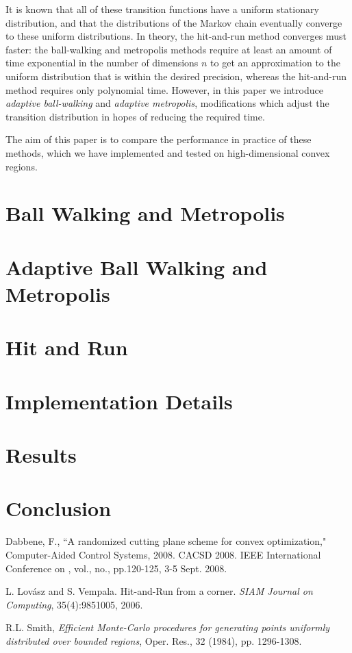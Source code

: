 \documentclass[11pt]{article}
\begin{document}
It is known that all of these transition functions have a uniform stationary distribution, and that the distributions of the Markov chain eventually converge to these uniform distributions. In theory, the hit-and-run method converges must faster: the ball-walking and metropolis methods require at least an amount of time exponential in the number of dimensions $n$ to get an approximation to the uniform distribution that is within the desired precision, whereas the hit-and-run method requires only polynomial time. However, in this paper we introduce \emph{adaptive ball-walking} and \emph{adaptive metropolis}, modifications which adjust the transition distribution in hopes of reducing the required time.

The aim of this paper is to compare the performance in practice of these methods, which we have implemented and tested on high-dimensional convex regions.

\section{Ball Walking and Metropolis}

\section{Adaptive Ball Walking and Metropolis}

\section{Hit and Run}

\section{Implementation Details}

\section{Results}

\section{Conclusion}

\pagebreak

\begin{thebibliography}{99}

 Dabbene, F., ``A randomized cutting plane scheme for convex optimization," Computer-Aided Control Systems, 2008. CACSD 2008. IEEE International Conference on , vol., no., pp.120-125, 3-5 Sept. 2008.

 L. Lov\'asz and S. Vempala. Hit-and-Run from a corner. \emph{SIAM Journal on Computing}, 35(4):9851005, 2006.

 R.L. Smith, \emph{Efficient Monte-Carlo procedures for generating points uniformly distributed over
bounded regions}, Oper. Res., 32 (1984), pp. 1296-1308.

\end{thebibliography}
\end{document}
